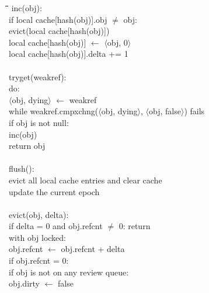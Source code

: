 \begin{figure}
  \begin{tabbing}
    \quad\=\quad\=\quad\=\quad\=\quad\=\quad\=\kill
    inc(obj): \+\\
      if local cache[hash(obj)].obj $\ne$ obj: \+\\
        evict(local cache[hash(obj)]) \\
        local cache[hash(obj)] $\gets$ $\langle$obj, 0$\rangle$ \-\\
      local cache[hash(obj)].delta += 1 \\
    \-\\
    tryget(weakref): \+\\
      do: \+\\
        $\langle$obj, dying$\rangle$ $\gets$ weakref \-\\
      while weakref.cmpxchng($\langle$obj, dying$\rangle$,
        $\langle$obj, false$\rangle$) fails \\
      if obj is not null: \+\\
        inc(obj) \-\\
      return obj \\
    \-\\
    flush(): \+\\
      evict all local cache entries and clear cache \\
      update the current epoch \\
    \-\\
    evict(obj, delta): \+\\
      if delta = 0 and obj.refcnt $\ne$ 0: return \\
      with obj locked: \+\\
        obj.refcnt $\gets$ obj.refcnt + delta \\
        if obj.refcnt = 0: \+\\
          if obj is not on any review queue: \+\\
            obj.dirty $\gets$ false \\

\end{tabbing}
\end{figure}
